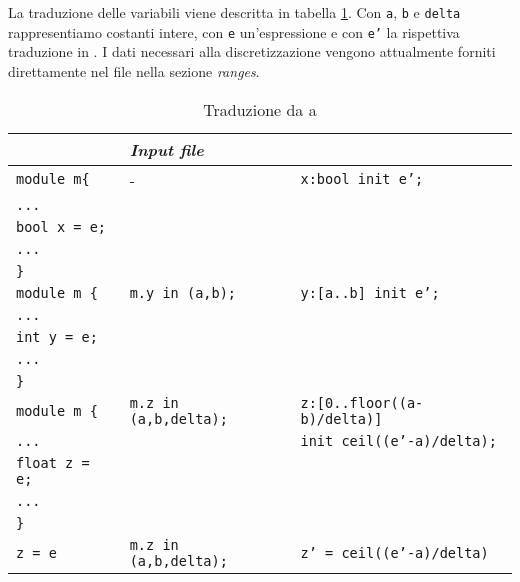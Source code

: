 La traduzione delle variabili viene descritta in tabella \ref{tab:sealtoprism}. Con \texttt{a}, \texttt{b} e \texttt{delta} rappresentiamo costanti intere, con \texttt{e} un'espressione \seal{} e con \texttt{e'} la rispettiva traduzione in \prism{}. I dati necessari alla discretizzazione vengono attualmente forniti direttamente nel file \prism{} nella sezione \emph{ranges}.
\begin{table}[htbp!]
\centering
\begin{tabular}{|l|l|l|}
	\hline
	\seal{} & \emph{Input file} &\prism{} \\
	\hline
	\texttt{module m\{} & - & \texttt{x:bool init e';} \\
	\texttt{...} & & \\
	\texttt{bool x = e;}  & & \\
	\texttt{...} & & \\
	\texttt{\}} & & \\
	\hline
	\texttt{module m \{} & \texttt{m.y in (a,b);} & \texttt{y:[a..b] init e';} \\
	\texttt{...} & & \\
	\texttt{int y = e;} & & \\
	\texttt{...} & & \\
	\texttt{\}} & & \\
	\hline
	\texttt{module m \{} & \texttt{m.z in (a,b,delta);} & \texttt{z:[0..floor((a-b)/delta)]} \\
	\texttt{...} & & \texttt{init ceil((e'-a)/delta);} \\
	\texttt{float z = e;} & & \\
	\texttt{...} & & \\
	\texttt{\}} & & \\
	\hline
	\texttt{z = e} & \texttt{m.z in (a,b,delta);} & \texttt{z' = ceil((e'-a)/delta)} \\
	\hline
\end{tabular}
\caption{Traduzione da \seal{} a \prism{}}
\label{tab:sealtoprism}
\end{table}

